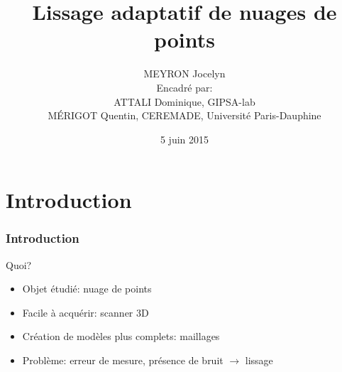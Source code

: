 \documentclass{beamer}
\title[Lissage adaptatif de nuages de points]{Lissage adaptatif de nuages de
    points}
\author[MEYRON Jocelyn]{MEYRON Jocelyn\\\scriptsize{Encadré par:\\
        ATTALI Dominique, GIPSA-lab\\
        MÉRIGOT Quentin, CEREMADE, Université Paris-Dauphine}}
\institute{GIPSA-lab}
\date{5 juin 2015}
\begin{document}
\begin{frame}
    \titlepage
\end{frame}

\begin{frame}
    \tableofcontents
\end{frame}

\section{Introduction}

\begin{frame}[allowframebreaks]
    \frametitle{Introduction}

    Quoi?
    \begin{itemize}
        \item Objet étudié: nuage de points
        \item Facile à acquérir: scanner 3D
        \item Création de modèles plus complets: maillages
        \item Problème: erreur de mesure, présence de bruit $ \to $ lissage
    \end{itemize}


\end{frame}
\end{document}
